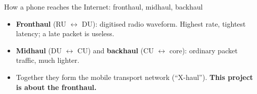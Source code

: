 \documentclass[aspectratio=169,11pt]{beamer}
\begin{document}
\begin{frame}{How a phone reaches the Internet: fronthaul, midhaul, backhaul}
\begin{tikzpicture}[font=\small,>=Stealth,
  unit/.style={draw,rounded corners,align=center,minimum height=1.15cm,minimum width=1.7cm,inner sep=3pt},
  lbl/.style={font=\footnotesize\bfseries,align=center}]
\end{tikzpicture}
\vspace{0.3cm}
\begin{itemize}\small
  \item \textbf{Fronthaul} (RU $\leftrightarrow$ DU): digitised radio waveform. Highest rate, tightest latency; a late packet is useless.
  \item \textbf{Midhaul} (DU $\leftrightarrow$ CU) and \textbf{backhaul} (CU $\leftrightarrow$ core): ordinary packet traffic, much lighter.
  \item Together they form the mobile transport network (``X-haul''). \textbf{This project is about the fronthaul.}
\end{itemize}
\end{frame}

\end{document}
